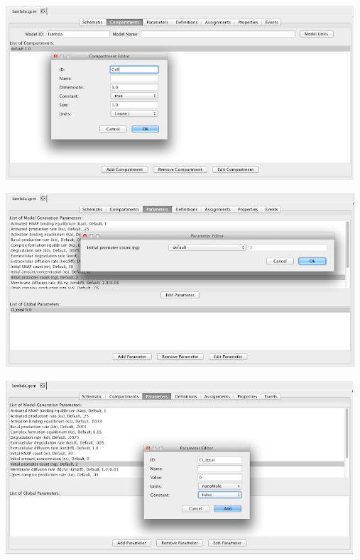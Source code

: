 \documentclass[titlepage,11pt]{article}
\begin{document}
\begin{center}
\includegraphics[height=65mm]{screenshots/compartment}
\end{center}



\begin{center}
\includegraphics[height=65mm]{screenshots/GCMparam}
\end{center}

\begin{center}
\includegraphics[height=65mm]{screenshots/parameter}
\end{center}
\end{document}
